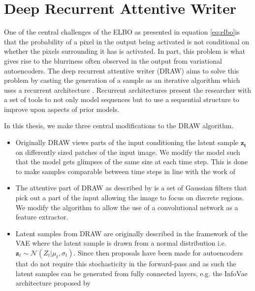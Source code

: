 \section{Deep Recurrent Attentive Writer}\label{sec:draw}

One of the central challenges of the ELBO as presented in equation \ref{eq:elbo}is that the probability of a pixel in the output being activated is not conditional on whether the pixels surrounding it has is activated. In part, this problem is what gives rise to the blurriness often observed in the output from variational autoencoders. The deep recurrent attentive writer (DRAW) aims to solve this problem by casting the generation of a sample as an iterative algorithm which uses a recurrent architecture \cite{Gregor2015}. Recurrent architectures present the researcher with a set of tools to not only model sequences but to use a sequential structure to improve upon aspects of prior models.

In this thesis, we make three central modifications to the DRAW algorithm. 

\begin{itemize}
\item Originally DRAW views parts of the input conditioning the latent sample $\boldsymbol{z_t}$ on differently sized patches of the input image. We modify the model such that the model gets glimpses of the same size at each time step. This is done to make samples comparable between time steps in line with the work of \citet{Harris2019}
\item The attentive part of DRAW as described by \citet{Gregor2015} is a set of Gaussian filters that pick out a part of the input allowing the image to focus on discrete regions. We modify the algorithm to allow the use of a convolutional network as a feature extractor.
\item Latent samples from DRAW are originally described in the framework of the VAE where the latent sample is drawn from a normal distribution i.e. $\boldsymbol{z}_t \sim \mathcal{N}(Z_t|\mu_t, \sigma_t)$. Since then proposals have been made for autoencoders that do not require this stochasticity in the forward-pass and as such the latent samples can be generated from fully connected layers, e.g. the InfoVae architecture proposed by \citet{Zhao}
\end{itemize}

